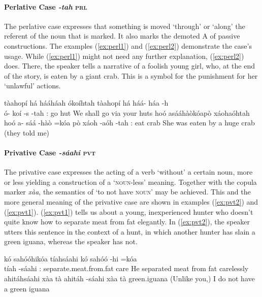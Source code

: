 \documentclass[a4paper, 12pt, oneside]{memoir}
\newcommand{\emh}[1]{\textit{#1}}
\begin{document}
\paragraph{Perlative Case \emh{-tah} \textsc{prl}}
The perlative case expresses that something is moved `through' or `along' the referent of the noun that is marked. It also marks the demoted A of passive constructions. The examples (\ref{ex:perl1}) and (\ref{ex:perl2}) demonstrate the case's usage. While (\ref{ex:perl1}) might not need any further explanation, (\ref{ex:perl2}) does. There, the speaker tells a narrative of a foolish young girl, who, at the end of the story, is eaten by a giant crab. This is a symbol for the punishment for her `unlawful' actions.
\begin{examples}
\newbaarucmd{\cl}{\baarujuncture{\texttt{==}}}
\ex \label{ex:perl1}
\words tàahopí há hááháah ókoíhtah
\bits tàahopí há háá- háa -h  \\ ó- koí -s -tah 
\gloss {\Fas}:{\Subject} {\Cngr} {\Hort} go {\Ff} {\Ssposs} hut {\Pl} {\Prl}
\tr We shall go via your huts
\ex \label{ex:perl2}
\words hoó asááhàòkóapò xáohaóhtah
\bits hoó a- sáá -hàò =kóa \cl pò xáoh -aóh -tah
\gloss {\Tsf}:{\Patient} {\Pass} eat {\Dpasto} {\Decl} {\Infer} crab {\Auga} {\Prl}
\tr She was eaten by a huge crab (they told me)
\end{examples}
\paragraph{Privative Case \emh{-sáahi} \textsc{pvt}}
The privative case expresses the acting of a verb `without' a certain noun, more or less yielding a construction of a `\textsc{noun}-less' meaning. Together with the copula marker \textit{xàa}, the semantics of `to not have \textsc{noun}' may be achieved. This and the more general meaning of the privative case are shown in examples (\ref{ex:pvt2}) and (\ref{ex:pvt1}). (\ref{ex:pvt1}) tells us about a young, inexperienced hunter who doesn't quite know how to separate meat from fat elegantly. In (\ref{ex:pvt2}), the speaker utters this sentence in the context of a hunt, in which another hunter has slain a green iguana, whereas the speaker has not.
\begin{examples}
\ex \label{ex:pvt1}
\words kó sahóóhikóa tíahsáahi
\bits kó sahóó -hi =kóa \\ tíah -sáahi
\gloss {\Tsm}:{\Subject} separate.meat.from.fat {\Rpastt} {\Decl} care {\Pvt}
\tr He separated meat from fat carelessly
\ex \label{ex:pvt2}
\words ahitáhsáahi xàa tà
\bits ahitáh -sáahi xàa tà
\gloss green.iguana {\Pvt} {\Cop} {\Fs}
\tr (Unlike you,) I do not have a green iguana
\end{examples}
\end{document}

